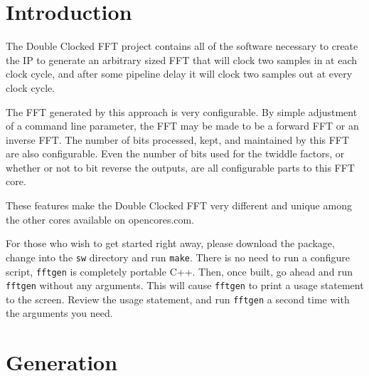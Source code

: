 \documentclass{gqtekspec}
\begin{document}
\chapter{Introduction}
\setcounter{page}{1}

The Double Clocked FFT project contains all of the software necessary to
create the IP to generate an arbitrary sized FFT that will clock two samples
in at each clock cycle, and after some pipeline delay it will clock two
samples out at every clock cycle.

The FFT generated by this approach is very configurable.  By simple adjustment
of a command line parameter, the FFT may be made to be a forward FFT or an
inverse FFT.  The number of bits processed, kept, and maintained by this
FFT are also configurable.  Even the number of bits used for the twiddle
factors, or whether or not to bit reverse the outputs, are all configurable
parts to this FFT core.

These features make the Double Clocked FFT very different and unique among the
other cores available on opencores.com.

For those who wish to get started right away, please download the package,
change into the {\tt sw} directory and run {\tt make}.  There is no need to
run a configure script, {\tt fftgen} is completely portable C++.  Then, once
built, go ahead and run {\tt fftgen} without any arguments.  This will cause
{\tt fftgen} to print a usage statement to the screen.  Review the usage
statement, and run {\tt fftgen} a second time with the arguments you need.


\chapter{Generation}
\end{document}
